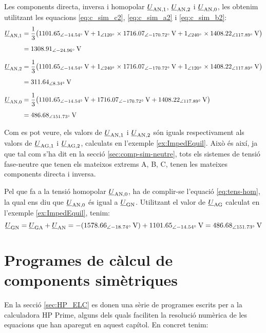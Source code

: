 \begin{exemple}
    Les components directa, inversa i homopolar $\underline{U}_\mathrm{AN,1}$, $\underline{U}_\mathrm{AN,2}$ i
    $\underline{U}_\mathrm{AN,0}$, les obtenim utilitzant les equacions
    \eqref{eq:c_sim_c2}, \eqref{eq:c_sim_a2} i \eqref{eq:c_sim_b2}:
    \begin{align*}
        \cmplx{U}\ped{AN,1} &= \frac{1}{3} \big(
        \qtypd{1101,65}{-14,54}{V} + \numpd{1}{120} \times \qtypd{1716,07}{-170,72}{V} +
        \numpd{1}{240} \times \qtypd{1408,22}{117,89}{V} \big) \\[1ex]
        &= \qtypd{1308,91}{-24,96}{V} \\[1.5ex]
        \cmplx{U}\ped{AN,2} &= \frac{1}{3} \big(
        \qtypd{1101,65}{-14,54}{V} + \numpd{1}{240} \times \qtypd{1716,07}{-170,72}{V} +
        \numpd{1}{120} \times \qtypd{1408,22}{117,89}{V} \big) \\[1ex]
        &= \qtypd{311,64}{8,34}{V} \\[1.5ex]
        \cmplx{U}\ped{AN,0} &= \frac{1}{3} \big(
        \qtypd{1101,65}{-14,54}{V} + \qtypd{1716,07}{-170,72}{V} + \qtypd{1408,22}{117,89}{V} \big)  \\[1ex]
        &= \qtypd{486,68}{151,73}{V}
    \end{align*}

    Com es pot veure, els valors de $\underline{U}_\mathrm{AN,1}$ i $\underline{U}_\mathrm{AN,2}$ són iguals respectivament als valors de $\underline{U}_\mathrm{AG,1}$ i $\underline{U}_\mathrm{AG,2}$, calculats en l'exemple \ref{ex:ImpedEquil}.
    Això és així, ja que tal com s'ha dit en la secció \vref{sec:comp-sim-neutre}, tots els sistemes de tensió fase-neutre que tenen els mateixos extrems A, B, C, tenen les mateixes components directa i inversa.

    Pel que fa a la tensió homopolar $\underline{U}_\mathrm{AN,0}$, ha de complir-se l'equació \eqref{eq:tens-hom}, la qual ens diu que $\underline{U}_\mathrm{AN,0}$ és igual a $\underline{U}_\mathrm{GN}$. Utilitzant el valor de  $\underline{U}_\mathrm{AG}$ calculat en l'exemple \ref{ex:ImpedEquil}, tenim:
    \[
        \cmplx{U}\ped{GN} = \cmplx{U}\ped{GA} + \cmplx{U}\ped{AN} = -(\qtypd{1578,66}{-18,74}{V}) +
        \qtypd{1101,65}{-14,54}{V} = \qtypd{486,68}{151,73}{V}
    \]
\end{exemple}

\section{Programes de càlcul de components simètriques}\label{sec:calcul-comp-sim}

En la secció \vref{sec:HP_ELC} es donen  una sèrie de programes escrits per a la calculadora \textsf{HP Prime},
 alguns dels quals faciliten la resolució numèrica de les equacions que han aparegut en aquest capítol. En concret tenim:

